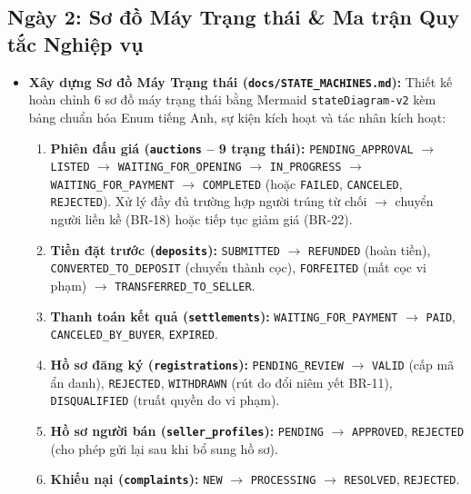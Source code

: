 \documentclass[a4paper]{article}
\begin{document}
\subsection{Ngày 2: Sơ đồ Máy Trạng thái \& Ma trận Quy tắc Nghiệp vụ}
\begin{itemize}
    \item \textbf{Xây dựng Sơ đồ Máy Trạng thái (\texttt{docs/STATE\_MACHINES.md}):}
    Thiết kế hoàn chỉnh 6 sơ đồ máy trạng thái bằng Mermaid \texttt{stateDiagram-v2} kèm bảng chuẩn hóa Enum tiếng Anh, sự kiện kích hoạt và tác nhân kích hoạt:
    \begin{enumerate}
        \item \textbf{Phiên đấu giá (\texttt{auctions} -- 9 trạng thái):} \texttt{PENDING\_APPROVAL} $\rightarrow$ \texttt{LISTED} $\rightarrow$ \texttt{WAITING\_FOR\_OPENING} $\rightarrow$ \texttt{IN\_PROGRESS} $\rightarrow$ \texttt{WAITING\_FOR\_PAYMENT} $\rightarrow$ \texttt{COMPLETED} (hoặc \texttt{FAILED}, \texttt{CANCELED}, \texttt{REJECTED}). Xử lý đầy đủ trường hợp người trúng từ chối $\rightarrow$ chuyển người liền kề (BR-18) hoặc tiếp tục giảm giá (BR-22).
        \item \textbf{Tiền đặt trước (\texttt{deposits}):} \texttt{SUBMITTED} $\rightarrow$ \texttt{REFUNDED} (hoàn tiền), \texttt{CONVERTED\_TO\_DEPOSIT} (chuyển thành cọc), \texttt{FORFEITED} (mất cọc vi phạm) $\rightarrow$ \texttt{TRANSFERRED\_TO\_SELLER}.
        \item \textbf{Thanh toán kết quả (\texttt{settlements}):} \texttt{WAITING\_FOR\_PAYMENT} $\rightarrow$ \texttt{PAID}, \texttt{CANCELED\_BY\_BUYER}, \texttt{EXPIRED}.
        \item \textbf{Hồ sơ đăng ký (\texttt{registrations}):} \texttt{PENDING\_REVIEW} $\rightarrow$ \texttt{VALID} (cấp mã ẩn danh), \texttt{REJECTED}, \texttt{WITHDRAWN} (rút do đổi niêm yết BR-11), \texttt{DISQUALIFIED} (truất quyền do vi phạm).
        \item \textbf{Hồ sơ người bán (\texttt{seller\_profiles}):} \texttt{PENDING} $\rightarrow$ \texttt{APPROVED}, \texttt{REJECTED} (cho phép gửi lại sau khi bổ sung hồ sơ).
        \item \textbf{Khiếu nại (\texttt{complaints}):} \texttt{NEW} $\rightarrow$ \texttt{PROCESSING} $\rightarrow$ \texttt{RESOLVED}, \texttt{REJECTED}.
    \end{enumerate}
    

\end{itemize}
\end{document}

